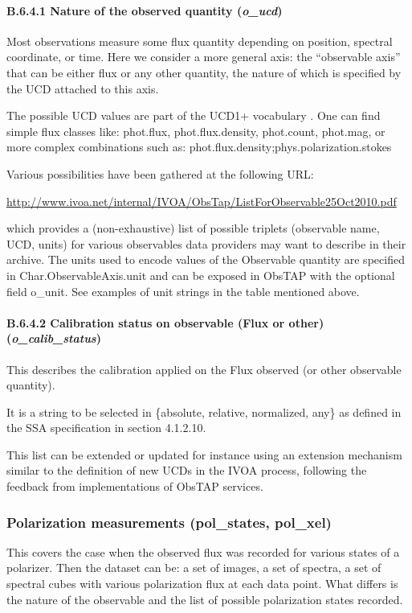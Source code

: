 \documentclass[11pt,a4paper]{ivoa}
\begin{document}
\paragraph{B.6.4.1 Nature of the observed quantity (\emph{o\_ucd})}
Most observations measure some flux quantity depending on position, spectral coordinate, or time.  Here we consider a
more general axis: the ``observable axis'' that can be either flux or any other quantity, the nature of which is
specified by the UCD attached to this axis.

The possible UCD values are part of the UCD1+ vocabulary \citep{2007ivoa.spec.0402P} . One can find simple flux classes
like: phot.flux, phot.flux.density, phot.count, phot.mag, or more complex combinations such as:
phot.flux.density;phys.polarization.stokes

Various possibilities have been gathered at the following URL:

\url{http://www.ivoa.net/internal/IVOA/ObsTap/ListForObservable25Oct2010.pdf}

which provides a (non-exhaustive) list of possible triplets (observable name, UCD, units) for various observables data
providers may want to describe in their archive. The units used to encode values of the Observable quantity are
specified in Char.ObservableAxis.unit and can be exposed in ObsTAP with the optional field o\_unit. See examples of
unit strings in the table mentioned above.

\paragraph{B.6.4.2 Calibration status on observable (Flux or other) (\emph{o\_calib\_status})}
This describes the calibration applied on the Flux observed (or other observable quantity).

It is a string to be selected in \{absolute, relative, normalized, any\} as defined in the SSA specification
\citep{2012ivoa.spec.0210T} in section 4.1.2.10.

This list can be extended or updated for instance using an extension mechanism similar to the definition of new UCDs in
the IVOA process, following the feedback from implementations of ObsTAP services.

\subsubsection{Polarization measurements (pol\_states, pol\_xel)}
\label{bkm:Ref482804077}\label{bkm:Ref482802717}This covers the case when the observed flux was recorded for various
states of a polarizer. Then the dataset can be: a set of images, a set of spectra, a set of spectral cubes with various
polarization flux at each data point. What differs is the nature of the observable and the list of possible
polarization states recorded.
\end{document}
